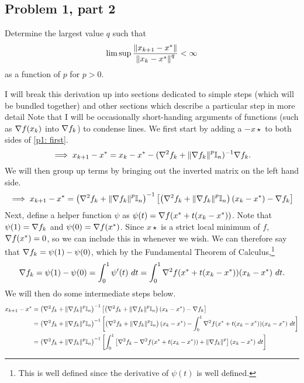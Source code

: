 \subsection{Problem 1, part 2}
Determine the largest value $q$ such that 
\[\limsup \frac{\norm{x_{k+1} - x^{*}}}{\norm{x_k - x^{*}}^q} < \infty\] 
as a function of $p$ for $p > 0$.
\partbreak
\begin{solution}

    I will break this derivation up into sections dedicated to simple steps (which will be bundled together) and other sections which describe a particular step in more detail Note that I will be occasionally short-handing arguments of functions (such as $\nabla f(x_k)$ into $\nabla f_k$) to condense lines. We first start by adding a $-x\star$ to both sides of \ref{p1: first}. 
    \[\implies x_{k+1} - x^{*} = x_k - x^{*} - (\nabla^2f_k + \norm{\nabla f_k}^p\mathbb{I}_n)^{-1} \nabla f_k.\]
    We will then group up terms by bringing out the inverted matrix on the left hand side.
    \[\implies x_{k+1} - x^{*} = \left ( \nabla^2f_k + \norm{\nabla f_k}^p \mathbb{I}_n\right)^{-1}\left[ \left(\nabla^2f_k + \norm{\nabla f_k}^p \mathbb{I}_n\right)(x_k - x^{*}) - \nabla f_k\right]\]
    Next, define a helper function $\psi$ as $\psi(t) = \nabla f(x^{*} + t(x_k - x^{*}))$. Note that $\psi(1) = \nabla f_k$ and $\psi(0) = \nabla f(x^{*})$. Since $x\star$ is a strict local minimum of $f$, $\nabla f(x^{*}) = 0$, so we can include this in whenever we wish. We can therefore say that $\nabla f_k = \psi(1) - \psi(0)$, which by the Fundamental Theorem of Calculus,\footnote{This is well defined since the derivative of $\psi(t)$ is well defined. } 
    \[\grad f_k = \psi(1) - \psi(0) =\int_0^1 \psi '(t) \ dt = \int_0^1 \grad^2 f(x\star + t(x_k - x\star)) (x_k - x\star) \ dt.\]
    We will then do some intermediate steps below.
{\footnotesize
    \begin{align*}
        x_{k+1} - x^{*} &= \left ( \nabla^2f_k + \norm{\nabla f_k}^p \mathbb{I}_n\right)^{-1}\left[ \left(\nabla^2f_k + \norm{\nabla f_k}^p \mathbb{I}_n\right)(x_k - x^{*}) - \nabla f_k\right] \\
         &= \left ( \nabla^2f_k + \norm{\nabla f_k}^p \mathbb{I}_n\right)^{-1}\left[ \left(\nabla^2f_k + \norm{\nabla f_k}^p \mathbb{I}_n\right)(x_k - x^{*}) - \int_0^1 \nabla^2 f(x^{*} + t(x_k - x^{*})) (x_k - x^{*}) \ dt\right]\\ 
         &= \left ( \nabla^2f_k + \norm{\nabla f_k}^p \mathbb{I}_n\right)^{-1}\left[ \int_0^1 \left[ \nabla^2 f_k - \nabla^2f(x^{*} + t(x_k - x^{*})) + \norm{\nabla f_k}^p\right](x_k - x^{*}) \ dt\right]\\ 
    \end{align*}}
    \vspace{-20mm}
    

\end{solution}
